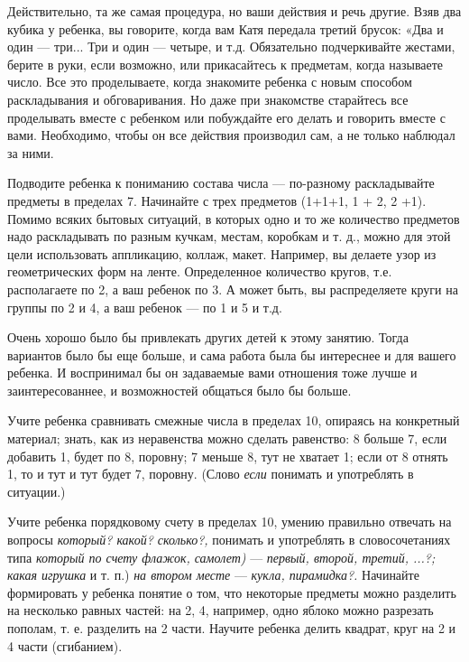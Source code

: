 \documentclass[a5paper]{book}
\renewcommand{\emph}[1]{\textit{#1}}
\begin{document}
Действительно, та же самая процедура, но ваши действия и речь другие.
Взяв два кубика у ребенка, вы говорите, когда вам Катя передала третий
брусок: «Два и один --- три... Три и один --- четыре, и т.д. Обязательно
подчеркивайте жестами, берите в руки, если возможно, или прикасайтесь к
предметам, когда называете число. Все это проделываете, когда знакомите
ребенка с новым способом раскладывания и обговаривания. Но даже при
знакомстве старайтесь все проделывать вместе с ребенком или побуждайте
его делать и говорить вместе с вами. Необходимо, чтобы он все действия
производил сам, а не только наблюдал за ними.

Подводите ребенка к пониманию состава числа --- по-разному раскладывайте
предметы в пределах 7. Начинайте с трех предметов (1+1+1, 1 + 2, 2 +1).
Помимо всяких бытовых ситуаций, в которых одно и то же количество
предметов надо раскладывать по разным кучкам, местам, коробкам и т. д.,
можно для этой цели использовать аппликацию, коллаж, макет. Например, вы
делаете узор из геометрических форм на ленте. Определенное количество
кругов, т.е. располагаете по 2, а ваш ребенок по 3. А может быть, вы
распределяете круги на группы по 2 и 4, а ваш ребенок --- по 1 и 5 и
т.д.

Очень хорошо было бы привлекать других детей к этому занятию. Тогда
вариантов было бы еще больше, и сама работа была бы интереснее и для
вашего ребенка. И воспринимал бы он задаваемые вами отношения тоже лучше
и заинтересованнее, и возможностей общаться было бы больше.

Учите ребенка сравнивать смежные числа в пределах 10, опираясь на
конкретный материал; знать, как из неравенства можно сделать равенство:
8 больше 7, если добавить 1, будет по 8, поровну; 7 меньше 8, тут не
хватает 1; если от 8 отнять 1, то и тут и тут будет 7, поровну. (Слово
\emph{если} понимать и употреблять в ситуации.)

Учите ребенка порядковому счету в пределах 10, умению правильно отвечать
на вопросы \emph{который? какой? сколько?,} понимать и употреблять в
словосочетаниях типа \emph{который по счету флажок, самолет)} ---
\emph{первый, второй, третий, ...?; какая игрушка} и т. п.) \emph{на
втором месте} --- \emph{кукла, пирамидка?.} Начинайте формировать у
ребенка понятие о том, что некоторые предметы можно разделить на
несколько равных частей: на 2, 4, например, одно яблоко можно разрезать
пополам, т. е. разделить на 2 части. Научите ребенка делить квадрат,
круг на 2 и 4 части (сгибанием).
\end{document}
